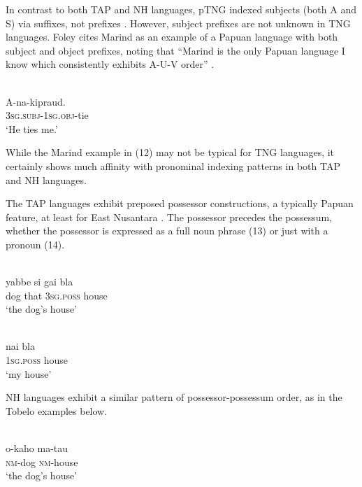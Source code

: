 In contrast to both TAP and NH languages, pTNG indexed subjects (both A and S) via suffixes, not prefixes \citep{Foley2000}. However, subject prefixes are not unknown in TNG languages. Foley cites Marind as an example of a Papuan language with both subject and object prefixes, noting that ``Marind is the only Papuan language I know which consistently exhibits A-U-V order'' \citeyearpar[138]{Foley1986}.

\ea%
 \\
\gll  A-na-kipraud. \\
   3\textsc{sg.subj-1sg.obj-}tie \\
\glt `He ties me.'
\z





While the Marind example in (12) may not be typical for TNG languages, it certainly shows much affinity with pronominal indexing patterns in both TAP and NH languages.

The TAP languages exhibit preposed possessor constructions, a typically Papuan feature, at least for East Nusantara \citep{KlamerEtAl2008}. The possessor precedes the possessum, whether the possessor is expressed as a full noun phrase (13) or just with a pronoun (14).


\ea%
 \\
\gll  yabbe si gai bla \\
   dog that \textsc{3sg.poss} house \\
\glt `the dog's house'
\z





\ea%
 \\
\gll  nai bla \\
  \textsc{1sg.poss} house \\
\glt `my house'
\z





NH languages exhibit a similar pattern of possessor-possessum order, as in the Tobelo examples below.

\ea%
 \\
\gll  o-kaho ma-tau \\
   \textsc{nm}-dog \textsc{nm}-house\\
\glt `the dog's house'
\z





